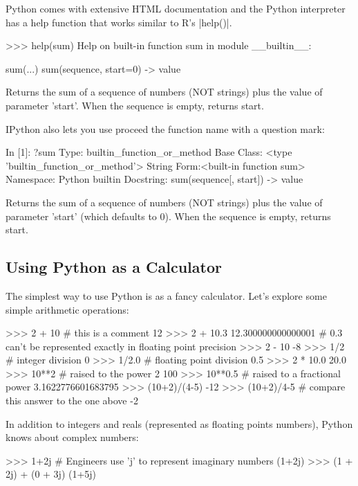 Python comes with extensive HTML documentation and the Python
interpreter has a help function that works similar to R's
|help()|.
%
\begin{python}
>>> help(sum)
Help on built-in function sum in module __builtin__:

sum(...)
    sum(sequence, start=0) -> value

    Returns the sum of a sequence of numbers (NOT strings) plus the value
    of parameter 'start'.  When the sequence is empty, returns start.
\end{python}
%
IPython also lets you use proceed the function name with a question
mark:
%
\begin{python}
In [1]: ?sum
Type:       builtin_function_or_method
Base Class: <type 'builtin_function_or_method'>
String Form:<built-in function sum>
Namespace:  Python builtin
Docstring:
sum(sequence[, start]) -> value

Returns the sum of a sequence of numbers (NOT strings) plus the value
of parameter 'start' (which defaults to 0).  When the sequence is
empty, returns start.
\end{python}


\subsection{Using Python as a Calculator}

The simplest way to use Python is as a fancy calculator. Let's explore some simple arithmetic operations:
%
\begin{python}
>>> 2 + 10   # this is a comment
12
>>> 2 + 10.3
 12.300000000000001  # 0.3 can't be represented exactly in floating point precision
>>> 2 - 10
-8
>>> 1/2  # integer division
0
>>> 1/2.0  # floating point division
0.5
>>> 2 * 10.0
20.0
>>> 10**2  # raised to the power 2
100
>>> 10**0.5  # raised to a fractional power
3.1622776601683795
>>> (10+2)/(4-5)
-12
>>> (10+2)/4-5  # compare this answer to the one above 
-2
\end{python}
%
In addition to integers and reals (represented as floating points
numbers), Python knows about complex numbers:
%
\begin{python}
>>> 1+2j  # Engineers use 'j' to represent imaginary numbers
(1+2j)
>>> (1 + 2j) + (0 + 3j)
(1+5j)
\end{python}

